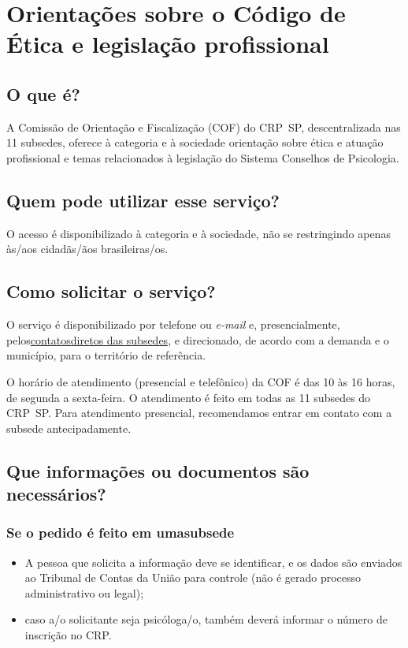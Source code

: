 \chapter{Orientações sobre o Código de Ética e legislação profissional}
\label{chap:of-codigo_de_etica}

\section{O que é?}

A Comissão de Orientação e Fiscalização (COF) do CRP~SP, descentralizada nas 11 subsedes, oferece à categoria e à sociedade orientação sobre ética e atuação profissional e temas relacionados à legislação do Sistema Conselhos de Psicologia.

\section{Quem pode utilizar esse serviço?}

O acesso é disponibilizado à categoria e à sociedade, não se restringindo apenas às/aos cidadãs/ãos brasileiras/os.

\section{Como solicitar o serviço?}

O serviço é disponibilizado por telefone ou \emph{e-mail} e, presencialmente, pelos\href{http://www.crpsp.org/noticia/view/2460/contatos-das-subsedes-do-crp-sp}{contatosdiretos das subsedes}, e direcionado, de acordo com a demanda e o município, para o território de referência.

O horário de atendimento (presencial e telefônico) da COF é das 10 às 16 horas, de segunda a sexta-feira. O atendimento é feito em todas as 11 subsedes do CRP~SP. Para atendimento presencial, recomendamos entrar em contato com a subsede antecipadamente.

\section{Que informações ou documentos são necessários?}

\subsection{Se o pedido é feito em umasubsede}

\begin{itemize}
  \item  A pessoa que solicita a informação deve se identificar, e os dados são  enviados ao Tribunal de Contas da União para controle (não é gerado  processo administrativo ou legal);
  \item  caso a/o solicitante seja psicóloga/o, também deverá informar o número de inscrição no CRP.
\end{itemize}

